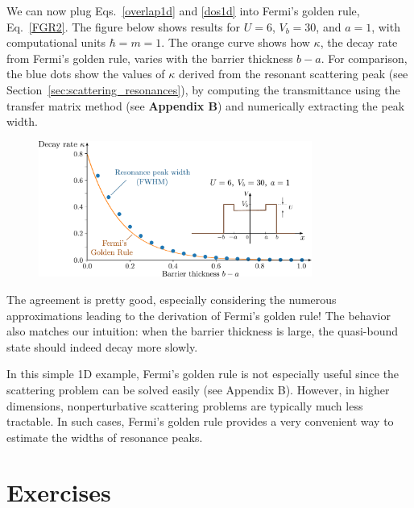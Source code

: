 \documentclass[pra,12pt]{revtex4-2}
\begin{document}
We can now plug Eqs.~\eqref{overlap1d} and \eqref{dos1d} into Fermi's
golden rule, Eq.~\eqref{FGR2}.  The figure below shows results for $U
= 6$, $V_b = 30$, and $a = 1$, with computational units $\hbar = m =
1$.  The orange curve shows how $\kappa$, the decay rate from Fermi's
golden rule, varies with the barrier thickness $b-a$.  For comparison,
the blue dots show the values of $\kappa$ derived from the resonant
scattering peak (see Section~\ref{sec:scattering_resonances}), by
computing the transmittance using the transfer matrix method (see
\textbf{Appendix B}) and numerically extracting the peak width.

\begin{figure}[h]
  \centering\includegraphics[width=0.8\textwidth]{goldenrule}
\end{figure}

\noindent
The agreement is pretty good, especially considering the numerous
approximations leading to the derivation of Fermi's golden rule!  The
behavior also matches our intuition: when the barrier thickness is
large, the quasi-bound state should indeed decay more slowly.

In this simple 1D example, Fermi's golden rule is not especially
useful since the scattering problem can be solved easily (see Appendix
B).  However, in higher dimensions, nonperturbative scattering
problems are typically much less tractable.  In such cases, Fermi's
golden rule provides a very convenient way to estimate the widths of
resonance peaks.

\section*{Exercises}
\end{document}
